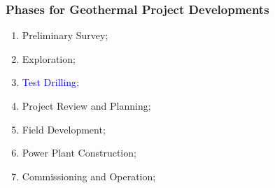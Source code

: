 \documentclass[10pt,compress]{beamer}
\newcommand{\blue}{\textcolor{blue}}
\begin{document}
\begin{frame}
 \frametitle{Phases for Geothermal Project Developments} 
    \begin{enumerate}[1.]
       \item <1-> Preliminary Survey;
       \item <1-> Exploration; 
       \item <2-> \blue{Test Drilling};
       \item <1-> Project Review and Planning;
       \item <1-> Field Development; 
       \item <1-> Power Plant Construction;
       \item <1-> Commissioning and Operation;
    \end{enumerate}
\end{frame}
\end{document}
